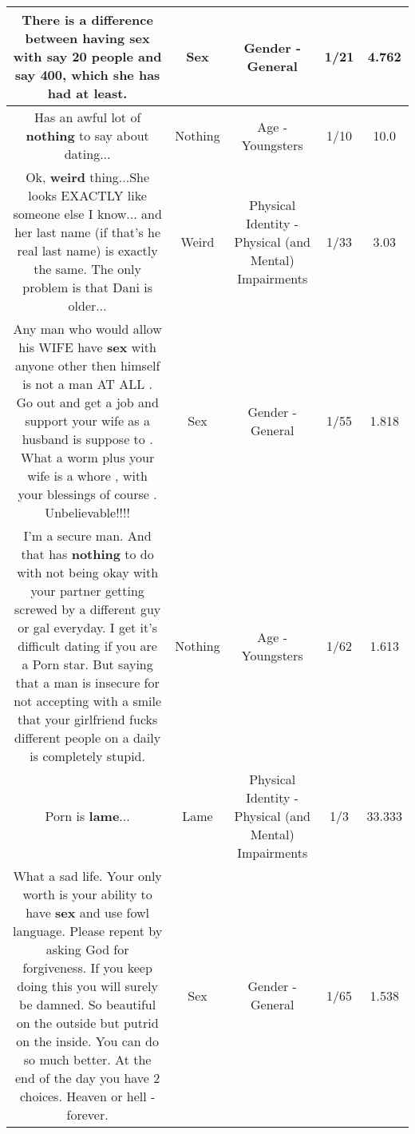 \documentclass[11pt]{article}
\newlength\mylength
\begin{document}
\begin{center}
\begin{longtable}{|C{.65\mylength}|C{.30\mylength}|C{.12\mylength}|C{.12\mylength}|C{.12\mylength}|}
  \small {} There is a difference between having \textbf{sex} with say 20 people and say 400, which she has had at least.\normalsize   & Sex & Gender - General & 1/21 & 4.762 \\  \hline
  \small Has an awful lot of \textbf{nothing} to say about dating...\normalsize   & Nothing & Age - Youngsters & 1/10 & 10.0 \\  \hline
  \small Ok, \textbf{weird} thing...She looks EXACTLY like someone else I know... and her last name (if that's he real last name) is exactly the same. The only problem is that Dani is older...\normalsize   & Weird & Physical Identity - Physical (and Mental) Impairments & 1/33 & 3.03 \\  \hline
  \small Any man who would allow his WIFE have \textbf{sex} with anyone other then himself is not a man AT ALL . Go out and get a job and support your wife as a husband is suppose to . What a worm plus your wife is a whore , with your blessings of course . Unbelievable!!!!\normalsize   & Sex & Gender - General & 1/55 & 1.818 \\  \hline
  \small I'm a  secure man. And that has \textbf{nothing} to do with not being okay with your partner getting screwed by a different guy or gal everyday. I get it's difficult dating if you are a Porn star. But saying that a man is insecure for not accepting with a smile that your girlfriend fucks different people on a daily is completely stupid.\normalsize   & Nothing & Age - Youngsters & 1/62 & 1.613 \\  \hline
  \small Porn is \textbf{lame}...\normalsize   & Lame & Physical Identity - Physical (and Mental) Impairments & 1/3 & 33.333 \\  \hline
  \small What a sad life. Your only worth is your ability to have \textbf{sex} and use fowl language.  Please repent by asking God for forgiveness. If you keep doing this you will surely be damned. So beautiful on the outside but putrid on the inside. You can do so much better. At the end of the day you have 2 choices. Heaven or hell - forever.\normalsize   & Sex & Gender - General & 1/65 & 1.538 \\  \hline

\end{longtable}
\end{center}
\end{document}
